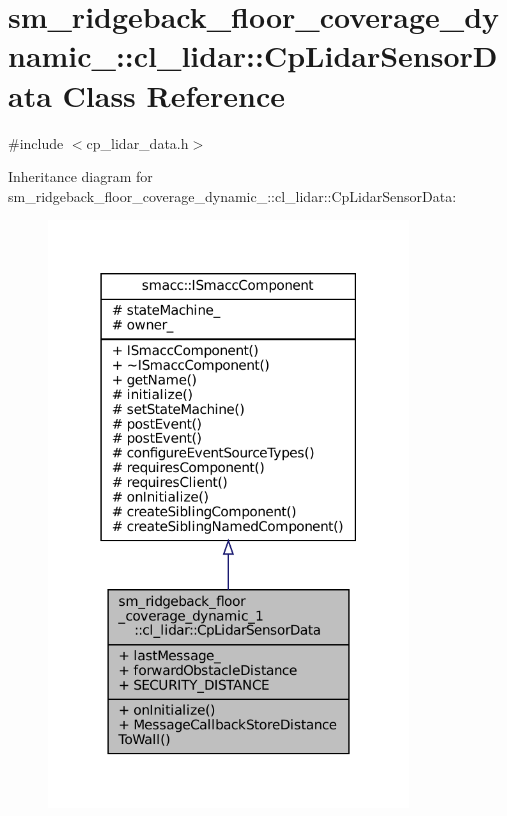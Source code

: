 \hypertarget{classsm__ridgeback__floor__coverage__dynamic__1_1_1cl__lidar_1_1CpLidarSensorData}{}\section{sm\+\_\+ridgeback\+\_\+floor\+\_\+coverage\+\_\+dynamic\+\_\+:\+:cl\+\_\+lidar\+:\+:Cp\+Lidar\+Sensor\+Data Class Reference}
\label{classsm__ridgeback__floor__coverage__dynamic__1_1_1cl__lidar_1_1CpLidarSensorData}


{\ttfamily \#include $<$cp\+\_\+lidar\+\_\+data.\+h$>$}



Inheritance diagram for sm\+\_\+ridgeback\+\_\+floor\+\_\+coverage\+\_\+dynamic\+\_\+:\+:cl\+\_\+lidar\+:\+:Cp\+Lidar\+Sensor\+Data\+:
\nopagebreak
\begin{figure}[H]
\begin{center}
\leavevmode
\includegraphics[width=271pt]{classsm__ridgeback__floor__coverage__dynamic__1_1_1cl__lidar_1_1CpLidarSensorData__inherit__graph}
\end{center}
\end{figure}


